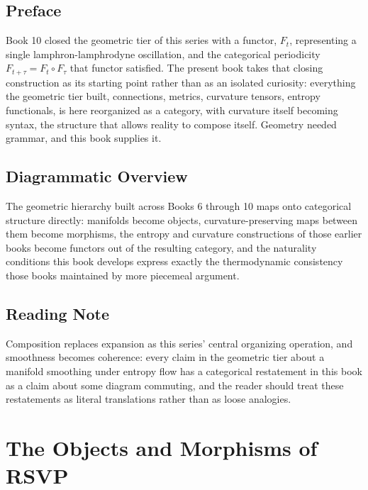 \chapter*{Preface}

Book 10 closed the geometric tier of this series with a functor, $F_t$, representing a single lamphron-lamphrodyne oscillation, and the categorical periodicity $F_{t+\tau} = F_t \circ F_\tau$ that functor satisfied. The present book takes that closing construction as its starting point rather than as an isolated curiosity: everything the geometric tier built, connections, metrics, curvature tensors, entropy functionals, is here reorganized as a category, with curvature itself becoming syntax, the structure that allows reality to compose itself. Geometry needed grammar, and this book supplies it.

\chapter*{Diagrammatic Overview}

The geometric hierarchy built across Books 6 through 10 maps onto categorical structure directly: manifolds become objects, curvature-preserving maps between them become morphisms, the entropy and curvature constructions of those earlier books become functors out of the resulting category, and the naturality conditions this book develops express exactly the thermodynamic consistency those books maintained by more piecemeal argument.

\chapter*{Reading Note}

Composition replaces expansion as this series' central organizing operation, and smoothness becomes coherence: every claim in the geometric tier about a manifold smoothing under entropy flow has a categorical restatement in this book as a claim about some diagram commuting, and the reader should treat these restatements as literal translations rather than as loose analogies.

\part{The Objects and Morphisms of RSVP}

